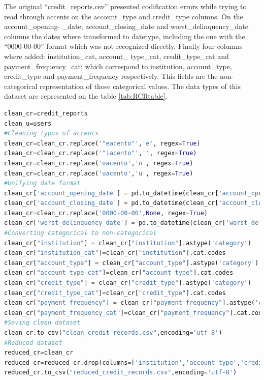 \documentclass[a4paper,12pt]{article}
\begin{document}
The original ``credit\_reports.csv'' presented codification errors while trying to read through accents on the account\_type and credit\_type columns. On the account\_opening- \_date, account\_closing\_date and worst\_delinquency\_date columns the dates where transformed to datetype, including the one with the ``0000-00-00'' format which was not recognized directly.
Finally four columns where added: institution\_cat, account\_ type\_cat, credit\_type\_cat and payment\_frequency\_cat; which correspond to institution, account\_type, credit\_type and payment\_frequency respectively. This fields are the non-categorical representation of those categorical values. The data types of this dataset are represented on the table \ref{tab:RCRtable}.\vspace{3mm}

\begin{lstlisting}[language=python,caption = {Data cleaning}]
clean_cr=credit_reports
clean_u=users
#Cleaning typos of accents
clean_cr=clean_cr.replace('"eacento"','e', regex=True)
clean_cr=clean_cr.replace('"iacento"','', regex=True)
clean_cr=clean_cr.replace('oacento','o', regex=True)
clean_cr=clean_cr.replace('uacento','u', regex=True)
#Unifying date format
clean_cr['account_opening_date'] = pd.to_datetime(clean_cr['account_opening_date'],format = "%x")
clean_cr['account_closing_date'] = pd.to_datetime(clean_cr['account_closing_date'],format = "%x")
clean_cr=clean_cr.replace('0000-00-00',None, regex=True)
clean_cr['worst_delinquency_date'] = pd.to_datetime(clean_cr['worst_delinquency_date'],format = "%x")
#Converting categorical to non-categorical
clean_cr["institution"] = clean_cr["institution"].astype('category')
clean_cr["institution_cat"]=clean_cr["institution"].cat.codes
clean_cr["account_type"] = clean_cr["account_type"].astype('category')
clean_cr["account_type_cat"]=clean_cr["account_type"].cat.codes
clean_cr["credit_type"] = clean_cr["credit_type"].astype('category')
clean_cr["credit_type_cat"]=clean_cr["credit_type"].cat.codes
clean_cr["payment_frequency"] = clean_cr["payment_frequency"].astype('category')
clean_cr["payment_frequency_cat"]=clean_cr["payment_frequency"].cat.codes
#Saving clean dataset
clean_cr.to_csv("clean_credit_records.csv",encoding='utf-8')
#Reduced dataset
reduced_cr=clean_cr
reduced_cr=reduced_cr.drop(columns=['institution','account_type','credit_type','total_credit_payments','payment_frequency'])
reduced_cr.to_csv("reduced_credit_records.csv",encoding='utf-8')
\end{lstlisting}\newpage
\end{document}
